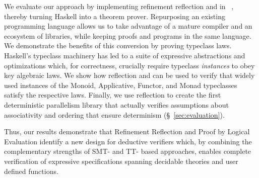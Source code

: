 \smallskip
%
We evaluate our approach by implementing
refinement reflection and \pbesym in
\toolname~\citep{Vazou14}, thereby
turning Haskell into a theorem prover.
%
Repurposing an existing programming language allows us
to take advantage of a mature compiler and an ecosystem of
libraries, while keeping proofs and programs in the same
language.
%
We demonstrate the benefits of this
conversion by proving typeclass laws.
%
Haskell's typeclass machinery has led
to a suite of expressive abstractions
and optimizations which, for correctness,
crucially require typeclass \emph{instances}
to obey key algebraic laws.
%
We show how reflection and \pbesym
can be used to verify that widely
used instances of the Monoid,
Applicative, Functor, and Monad
typeclasses satisfy the respective
laws.
%
Finally, we use reflection to
create the first deterministic
parallelism library that actually
verifies assumptions about
associativity and ordering
that ensure determinism (\S~\ref{sec:evaluation}).

Thus, our results demonstrate
that Refinement Reflection and
Proof by Logical Evaluation
identify a new design for
deductive verifiers which,
by combining the complementary
strengths of SMT- and TT- based
approaches, enables complete
verification of expressive
specifications spanning
decidable theories and
user defined functions.
